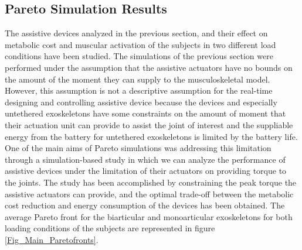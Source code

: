 \documentclass[10pt,letterpaper]{article}
\begin{document}
\subsection*{Pareto Simulation Results}
The assistive devices analyzed in the previous section, and their effect on metabolic cost and muscular activation of the subjects in two different load conditions have been studied. The simulations of the previous section were performed under the assumption that the assistive actuators have no bounds on the amount of the moment they can supply to the musculoskeletal model. However, this assumption is not a descriptive assumption for the real-time designing and controlling assistive device because the devices and especially untethered exoskeletons have some constraints on the amount of moment that their actuation unit can provide to assist the joint of interest and the suppliable energy from the battery for untethered exoskeletons is limited by the battery life. \\
One of the main aims of Pareto simulations was addressing this limitation through a simulation-based study in which we can analyze the performance of assistive devices under the limitation of their actuators on providing torque to the joints. 
The study has been accomplished by constraining the peak torque the assistive actuators can provide, and the optimal trade-off between the metabolic cost reduction and energy consumption of the devices has been obtained. The average Pareto front for the biarticular and monoarticular exoskeletons for both loading conditions of the subjects are represented in figure \ref{Fig_Main_Paretofronts}.\\
\end{document}
